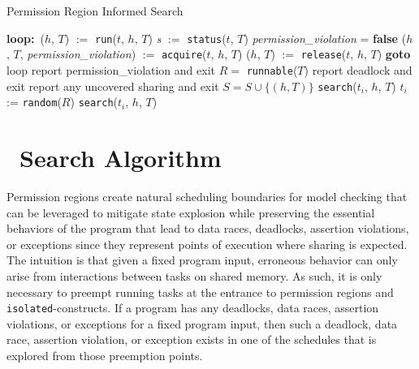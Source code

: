 \begin{algorithm}
\caption{Permission Region Informed Search}\label{algo:search}
\begin{algorithmic}[1]
  \State \textbf{loop:}\ ($h$, $T$) $:=$ \texttt{run}($t$, $h$, $T$)\label{loc:run}
  \State
  \State \textit{s} $:=$ \texttt{status}($t$, $T$)
  \State \textit{permission\_violation} = \textbf{false}
   \label{loc:PR}
  \State ($h$, $T$, \textit{permission\_violation}) $:=$ \texttt{acquire}($t$, $h$, $T$)\label{loc:acquire}
  \State ($h$, $T$) $:=$ \texttt{release}($t$, $h$, $T$)\label{loc:release}
  \State \textbf{goto} loop
  \EndIf
  \State
  \label{loc:datarace}
  \State report permission\_violation and exit
  \EndIf
  \State
  \State $R = $ \texttt{runnable}($T$)
  \label{loc:deadlock}
  \State report deadlock and exit
  \Else
  \State report any uncovered sharing and exit\label{loc:term}
  \EndIf
  \EndIf
  \State
  \label{loc:visited}
  \State $S = S \cup \{(h, T)\}$
  \label{loc:entry:isolated}
  \label{loc:prsched}
  \State \texttt{search}($t_i$, $h$, $T$)
  \EndFor
  \Else
  \State $t_i$ := \texttt{random}($R$)\label{loc:rand}
  \State \texttt{search}($t_i$, $h$, $T$)
  \EndIf
  \EndIf
\EndFunction
\end{algorithmic}
\end{algorithm}

\section{\jpfhj\ Search Algorithm}

Permission regions create natural scheduling boundaries for model checking that can be
leveraged to mitigate state explosion while preserving the essential
behaviors of the program that lead to data races, deadlocks, assertion violations, or exceptions since they represent points of execution where sharing is expected.  The intuition is that given a fixed
program input, erroneous behavior can only arise from interactions between tasks
on shared memory. As such, it is only necessary to preempt running
tasks at the entrance to permission regions and
\texttt{isolated}-constructs. If a program has any deadlocks, data
races, assertion violations, or exceptions for a fixed program input,
then such a deadlock, data race, assertion violation, or exception exists
in one of the schedules that is explored from those preemption points.

